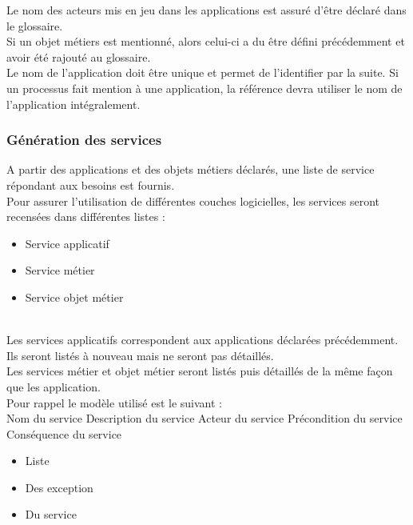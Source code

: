 Le nom des acteurs mis en jeu dans les applications est assuré d'être déclaré
dans le glossaire. \\

Si un objet métiers est mentionné, alors celui-ci a du être défini précédemment
et avoir été rajouté au glossaire. \\

Le nom de l'application doit être unique et permet de l'identifier par la
suite. Si un processus fait mention à une application, la référence devra
utiliser le nom de l'application intégralement. \\

\subsubsection{Génération des services}
A partir des applications et des objets métiers déclarés, une liste de service
répondant aux besoins est fournis. \\

Pour assurer l'utilisation de différentes couches logicielles, les services
seront recensées dans différentes listes : \\
\begin{itemize}
  \item Service applicatif
  \item Service métier
  \item Service objet métier
\end{itemize}

~\\

Les services applicatifs correspondent aux applications déclarées précédemment.
Ils seront listés à nouveau mais ne seront pas détaillés. \\

Les services métier et objet métier seront listés puis détaillés de la même
façon que les application. \\

Pour rappel le modèle utilisé est le suivant : \\

\CUBref
{Nom du service}
{Description du service}
{Acteur du service}
{Précondition du service}
{Conséquence du service}
{
  \begin{itemize}
    \item Liste
    \item Des exception
    \item Du service
  \end{itemize}
}

